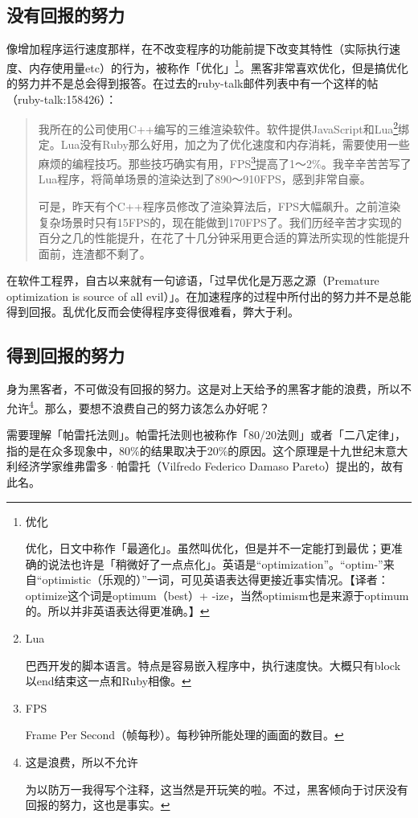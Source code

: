 \documentclass[a4paper,12pt]{article}
\newcommand\ja[1]{{\CJKfamily{gothic}#1}}
\begin{document}
\subsection{没有回报的努力}

像增加程序运行速度那样，在不改变程序的功能前提下改变其特性（实际执行速度、内存使用量etc）的行为，被称作「优化」\footnote{优化

优化，日文中称作「\ja{最適化}」。虽然叫优化，但是并不一定能打到最优；更准确的说法也许是「稍微好了一点点化」。英语是“optimization”。“optim-”来自“optimistic（乐观的）”一词，可见英语表达得更接近事实情况。【译者：optimize这个词是optimum（best）+ -ize，当然optimism也是来源于optimum的。所以并非英语表达得更准确。】}。黑客非常喜欢优化，但是搞优化的努力并不是总会得到报答。在过去的ruby-talk邮件列表中有一个这样的帖（ruby-talk:158426）：
\begin{quote}
  我所在的公司使用C++编写的三维渲染软件。软件提供JavaScript和Lua\footnote{Lua

    巴西开发的脚本语言。特点是容易嵌入程序中，执行速度快。大概只有block以end结束这一点和Ruby相像。}绑定。Lua没有Ruby那么好用，加之为了优化速度和内存消耗，需要使用一些麻烦的编程技巧。那些技巧确实有用，FPS\footnote{FPS

  Frame Per Second（帧每秒）。每秒钟所能处理的画面的数目。}提高了1～2\%。我辛辛苦苦写了Lua程序，将简单场景的渲染达到了890～910FPS，感到非常自豪。

  可是，昨天有个C++程序员修改了渲染算法后，FPS大幅飙升。之前渲染复杂场景时只有15FPS的，现在能做到170FPS了。我们历经辛苦才实现的百分之几的性能提升，在花了十几分钟采用更合适的算法所实现的性能提升面前，连渣都不剩了。
\end{quote}
在软件工程界，自古以来就有一句谚语，「过早优化是万恶之源（Premature optimization is source of all evil）」。在加速程序的过程中所付出的努力并不是总能得到回报。乱优化反而会使得程序变得很难看，弊大于利。

\subsection{得到回报的努力}

身为黑客者，不可做没有回报的努力。这是对上天给予的黑客才能的浪费，所以不允许\footnote{这是浪费，所以不允许

为以防万一我得写个注释，这当然是开玩笑的啦。不过，黑客倾向于讨厌没有回报的努力，这也是事实。}。那么，要想不浪费自己的努力该怎么办好呢？

需要理解「帕雷托法则」。帕雷托法则也被称作「80/20法则」或者「二八定律」，指的是在众多现象中，80\%的结果取决于20\%的原因。这个原理是十九世纪末意大利经济学家维弗雷多·帕雷托（Vilfredo Federico Damaso Pareto）提出的，故有此名。
\end{document}
